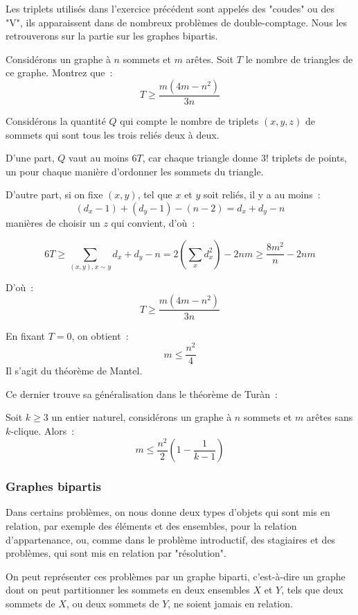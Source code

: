 Les triplets utilisés dans l'exercice précédent sont appelés des "coudes" ou des "V", ils apparaissent dans de nombreux problèmes de double-comptage. Nous les retrouverons sur la partie sur les graphes bipartis.

\begin{exo}[APMO 1989]
	Considérons un graphe à $n$ sommets et $m$ arêtes. Soit $T$ le nombre de triangles de ce graphe. Montrez que~:
	$$T \ge \frac{m(4m - n^2)}{3n}$$
\end{exo}
\begin{sol}
	Considérons la quantité $Q$ qui compte le nombre de triplets $(x, y, z)$ de sommets qui sont tous les trois reliés deux à deux.
	
	D'une part, $Q$ vaut au moins $6T$, car chaque triangle donne $3!$ triplets de points, un pour chaque manière d'ordonner les sommets du triangle.
	
	D'autre part, si on fixe $(x, y)$, tel que $x$ et $y$ soit reliés, il y a au moins~:
	$$(d_x - 1) + (d_y - 1) - (n - 2) = d_x + d_y - n$$
	manières de choisir un $z$ qui convient, d'où~:
	
	$$6T \ge \sum_{(x, y), x \sim y} d_x + d_y - n
	= 2\left ( \sum_x d_x^2 \right ) - 2nm
	\ge \frac{8m^2}{n} - 2nm$$
	
	D'où~:
	$$T \ge \frac{m(4m - n^2)}{3n}$$
\end{sol}

En fixant $T = 0$, on obtient~:
$$m \le \frac{n^2}{4}$$
Il s'agit du théorème de Mantel.

Ce dernier trouve sa généralisation dans le théorème de Turàn~:
\begin{thm}
	Soit $k \ge 3$ un entier naturel, considérons un graphe à $n$ sommets et $m$ arêtes sans $k$-clique. Alors~:
	$$m \le \frac{n^2}2 \left (1 - \frac1{k - 1} \right )$$
\end{thm}

\subsubsection{Graphes bipartis}

Dans certains problèmes, on nous donne deux types d'objets qui sont mis en relation, par exemple des éléments et des ensembles, pour la relation d'appartenance, ou, comme dans le problème introductif, des stagiaires et des problèmes, qui sont mis en relation par "résolution".

On peut représenter ces problèmes par un graphe biparti, c'est-à-dire un graphe dont on peut partitionner les sommets en deux ensembles $X$ et $Y$, tels que deux sommets de $X$, ou deux sommets de $Y$, ne soient jamais en relation.


